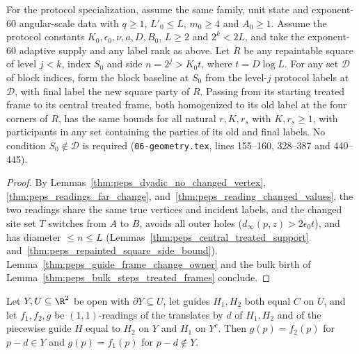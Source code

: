 \begin{lemma}
    For the protocol specialization, assume the same family, unit state and
    exponent-$60$ angular-scale data with $q\ge1$,
    $L'_0\le L$, $m_0\ge4$ and $A_0\ge1$. Assume the protocol constants
    $K_0,\epsilon_0,\nu,a,D,B_0$, $L\ge2$ and $2^k<2L$, and take the
    exponent-$60$ adaptive supply and any label rank as above. Let $R$ be
    any repaintable square of level $j<k$, index $S_0$ and side
    $n=2^j>K_0t$, where $t=D\log L$. For any set $\mathcal D$ of block
    indices, form the block baseline at $S_0$ from the level-$j$ protocol
    labels at $\mathcal D$, with final label the new square party of $R$.
    Passing from its starting treated frame to its central treated frame,
    both homogenized to its old label at the four corners of $R$, has the
    same bounds for all natural $r,K,r_s$ with $K,r_s\ge1$, with participants
    in any set containing the parties of its old and final labels. No condition
    $S_0\notin\mathcal D$ is required
    (\texttt{06-geometry.tex}, lines 155--160, 328--387 and 440--445).
\end{lemma}

\begin{proof}\leanok
    By Lemmas~\ref{thm:peps_dyadic_no_changed_vertex}, \ref{thm:peps_readings_far_change}, and~\ref{thm:peps_reading_changed_values}, the two readings share the same true vertices and incident labels, and the changed site set $T$ switches from $A$ to $B$, avoids all outer holes ($d_\infty(p,z)>2\epsilon_0t$), and has diameter $\le n\le L$ (Lemmas~\ref{thm:peps_central_treated_support} and~\ref{thm:peps_repainted_square_side_bound}). Lemma~\ref{thm:peps_guide_frame_change_owner} and the bulk birth of Lemma~\ref{thm:peps_bulk_steps_treated_frames} conclude.
\end{proof}

\begin{lemma}
    \label{thm:peps_reading_piecewise}
    \leanok
    Let $Y,U\subseteq\R^2$ be open with $\partial Y\subseteq U$, let guides $H_1,H_2$ both equal $C$ on $U$, and let $f_1,f_2,g$ be $(1,1)$-readings of the translates by $d$ of $H_1,H_2$ and of the piecewise guide $H$ equal to $H_2$ on $Y$ and $H_1$ on $Y^c$. Then $g(p)=f_2(p)$ for $p-d\in Y$ and $g(p)=f_1(p)$ for $p-d\notin Y$.
\end{lemma}

